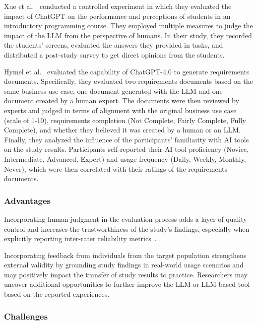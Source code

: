 Xue et al.~\cite{DBLP:conf/icse/XueCBTH24} conducted a controlled experiment in which they evaluated the impact of ChatGPT on the performance and perceptions of students in an introductory programming course.
They employed multiple measures to judge the impact of the LLM from the perspective of humans.
In their study, they recorded the students' screens, evaluated the answers they provided in tasks, and distributed a post-study survey to get direct opinions from the students.

Hymel et al.~\cite{hymel2025analysisllmsvshuman} evaluated the capability of ChatGPT-4.0 to generate requirements documents. 
Specifically, they evaluated two requirements documents based on the same business use case, one document generated with the LLM and one document created by a human expert.
The documents were then reviewed by experts and judged in terms of alignment with the original business use case (scale of 1-10), requirements completion (Not Complete, Fairly Complete, Fully Complete), and whether they believed it was created by a human or an LLM.
Finally, they analyzed the influence of the participants' familiarity with AI tools on the study results.
Participants self-reported their AI tool proficiency (Novice, Intermediate, Advanced, Expert) and usage frequency (Daily, Weekly, Monthly, Never), which were then correlated with their ratings of the requirements documents.


\subsubsection{Advantages}

Incorporating human judgment in the evaluation process adds a layer of quality control and increases the trustworthiness of the study's findings, especially when explicitly reporting inter-rater reliability metrics~\cite{khraisha2024canlargelanguagemodelshumans}.

Incorporating feedback from individuals from the target population strengthens external validity by grounding study findings in real-world usage scenarios and may positively impact the transfer of study results to practice.
Researchers may uncover additional opportunities to further improve the LLM or LLM-based tool based on the reported experiences.

\subsubsection{Challenges}

